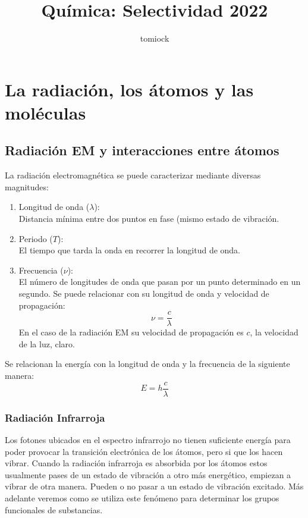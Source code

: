 \documentclass[arial,a4paper,print]{article}
\title{Química: Selectividad 2022}
\author{tomiock}
\begin{document}
	
\maketitle
	
\section{La radiación, los átomos y las moléculas}
\subsection{Radiación EM y interacciones entre átomos}
La radiación electromagnética se puede caracterizar mediante diversas magnitudes: 
\begin{enumerate}
	\item Longitud de onda ($\lambda$): \\
	Distancia mínima entre dos puntos en fase (mismo estado de vibración. 
	\item Periodo ($T$): \\
	El tiempo que tarda la onda en recorrer la longitud de onda. 
	\item Frecuencia ($\nu$): \\
	El número de longitudes de onda que pasan por un punto determinado en un segundo. Se puede relacionar con su longitud de onda y velocidad de propagación: 
	\begin{equation*}
			\nu = \frac{c}{\lambda}
	\end{equation*}
	En el caso de la radiación EM su velocidad de propagación es $c$, la velocidad de la luz, claro. 
\end{enumerate}
	
Se relacionan la energía con la longitud de onda y la frecuencia de la siguiente manera:
	\begin{equation*}
		E = h\frac{c}{\lambda} 
	\end{equation*}
	
\subsubsection{Radiación Infrarroja}
Los fotones ubicados en el espectro infrarrojo no tienen suficiente energía para poder provocar la transición electrónica de los átomos, pero si que los hacen vibrar. Cuando la radiación infrarroja es absorbida por los átomos estos usualmente pases de un estado de vibración a otro más energético, empiezan a vibrar de otra manera. Pueden o no pasar a un estado de vibración excitado. Más adelante veremos como se utiliza este fenómeno para determinar los grupos funcionales de substancias. 
	
\end{document}
